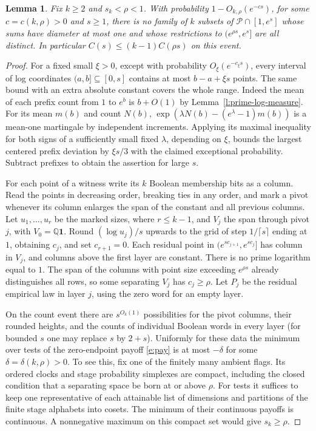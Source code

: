\documentclass[11pt]{article}
\newtheorem{lemma}[theorem]{Lemma}
\numberwithin{equation}{section}
\newcommand{\Q}{\mathbb Q}
\newcommand{\one}{\mathbf 1}
\begin{document}
\begin{lemma}\label{l:arithmetic-one-range}
Fix $k\ge2$ and $s_k<\rho<1$. With probability
$1-O_{k,\rho}(e^{-c s})$, for some $c=c(k,\rho)>0$ and $s\ge1$,
there is no family of $k$ subsets of $\mathcal P\cap[1,e^s]$
whose sums have diameter at most one and whose restrictions to
$(e^{\rho s},e^s]$ are all distinct. In particular
$C(s)\le(k-1)C(\rho s)$ on this event.
\end{lemma}
\begin{proof}
For a fixed small $\xi>0$, except with probability
$O_\xi(e^{-c_\xi s})$, every interval of log coordinates
$(a,b]\subseteq[0,s]$ contains at most $b-a+\xi s$ points.
The same bound with an extra absolute constant covers the whole
range. Indeed the mean of each prefix count from $1$ to $e^b$ is
$b+O(1)$ by Lemma~\ref{l:prime-log-measure}. For its mean $m(b)$
and count $N(b)$, $\exp(\lambda N(b)-(e^\lambda-1)m(b))$
is a mean-one martingale by independent increments. Applying its
maximal inequality for both signs of a sufficiently small fixed
$\lambda$, depending on $\xi$, bounds the largest centered prefix
deviation by $\xi s/3$ with the claimed exceptional probability.
Subtract prefixes to obtain the assertion for large $s$.

For each point of a witness write its $k$ Boolean membership bits
as a column. Read the points in decreasing order, breaking ties in
any order, and mark a pivot whenever its column enlarges the span
of the constant and all previous columns. Let $u_1,\ldots,u_r$ be
the marked sizes, where $r\le k-1$, and $V_j$ the span through
pivot $j$, with $V_0=\Q\one$. Round $(\log u_j)/s$ upwards to the
grid of step $1/\lceil s\rceil$ ending at $1$, obtaining $c_j$,
and set $c_{r+1}=0$. Each residual point in
$(e^{s c_{j+1}},e^{s c_j}]$ has column in $V_j$, and columns above
the first layer are constant. There is no prime logarithm equal to
$1$. The span of the columns with point size exceeding $e^{\rho s}$
already distinguishes all rows, so some separating $V_j$ has
$c_j\ge\rho$. Let $P_j$ be the residual empirical law in layer
$j$, using the zero word for an empty layer.

On the count event there are $s^{O_k(1)}$ possibilities for the
pivot columns, their rounded heights, and the counts of individual
Boolean words in every layer (for bounded $s$ one may replace $s$
by $2+s$). Uniformly for these data the minimum over tests of the
zero-endpoint payoff \eqref{e:pay} is at most $-\delta$ for some
$\delta=\delta(k,\rho)>0$. To see this, fix one of the finitely
many ambient flags. Its ordered clocks and stage probability
simplexes are compact, including the closed condition that a
separating space be born at or above $\rho$. For tests it suffices
to keep one representative of each attainable list of dimensions
and partitions of the finite stage alphabets into cosets. The
minimum of their continuous payoffs is continuous. A nonnegative
maximum on this compact set would give $s_k\ge\rho$.


\end{proof}
\end{document}
